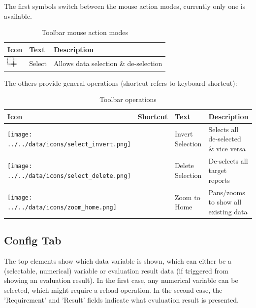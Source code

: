The first symbols switch between the mouse action modes, currently only one is available.

\begin{table}[H]
  \center
  \begin{tabular}{ | l | l | l |}
    \hline
    \textbf{Icon} & \textbf{Text} &  \textbf{Description} \\ \hline
    \includegraphics[width=0.5cm,frame]{../../data/icons/select_action.png} & Select & Allows data selection \& de-selection \\ \hline
  \end{tabular}
  \caption{Toolbar mouse action modes}
\end{table}

The others provide general operations (shortcut refers to keyboard shortcut):

\begin{table}[H]
  \center
  \begin{tabular}{ | l | l | l | l |}
    \hline
    \textbf{Icon} & \textbf{Shortcut} &\textbf{Text} &  \textbf{Description} \\ \hline
    \texttt{[image: ../../data/icons/select\_invert.png]} & & Invert Selection & Selects all de-selected \& vice versa \\ \hline
    \texttt{[image: ../../data/icons/select\_delete.png]} & & Delete Selection & De-selects all target reports \\ \hline
    \texttt{[image: ../../data/icons/zoom\_home.png]} & & Zoom to Home & Pans/zooms to show all existing data \\ \hline
  \end{tabular}
  \caption{Toolbar operations}
\end{table} 

\subsection{Config Tab}

The top elements show which data variable is shown, which can either be a (selectable, numerical) variable or evaluation result data (if triggered from showing an evaluation result). In the first case, any numerical variable can be selected, which might require a reload operation. In the second case, the 'Requirement' and 'Result' fields indicate what evuluation result is presented. \\

